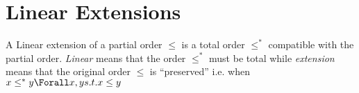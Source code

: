 \section{Linear Extensions}

A Linear extension of a partial order $\leq$ is a total order $\leq^*$ compatible with the partial order. \emph{Linear} means that the order $\leq^*$ must be total while \emph{extension} means that the original order $\leq$ is ``preserved'' i.e. when $x \leq^* y \Forall x, y s.t. x \leq y$ 